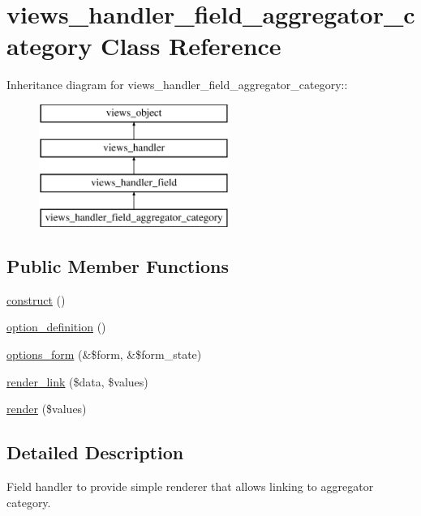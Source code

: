 \hypertarget{classviews__handler__field__aggregator__category}{
\section{views\_\-handler\_\-field\_\-aggregator\_\-category Class Reference}
\label{classviews__handler__field__aggregator__category}
}
Inheritance diagram for views\_\-handler\_\-field\_\-aggregator\_\-category::\begin{figure}[H]
\begin{center}
\leavevmode
\includegraphics[height=4cm]{classviews__handler__field__aggregator__category}
\end{center}
\end{figure}
\subsection*{Public Member Functions}
\begin{CompactItemize}
\item 
\hyperlink{classviews__handler__field__aggregator__category_d85fc06aa0e07281e3989dee8bd0c975}{construct} ()
\item 
\hyperlink{classviews__handler__field__aggregator__category_ff9a96fdcd4350cbe9323a9801996016}{option\_\-definition} ()
\item 
\hyperlink{classviews__handler__field__aggregator__category_43be8cbc1313b8b3f51321490d40a914}{options\_\-form} (\&\$form, \&\$form\_\-state)
\item 
\hyperlink{classviews__handler__field__aggregator__category_ed3df98f87fc7d2e61ff3206505e2822}{render\_\-link} (\$data, \$values)
\item 
\hyperlink{classviews__handler__field__aggregator__category_7e4b0ebcef6f6f5b37480eb15eb378f0}{render} (\$values)
\end{CompactItemize}


\subsection{Detailed Description}
Field handler to provide simple renderer that allows linking to aggregator category. 

